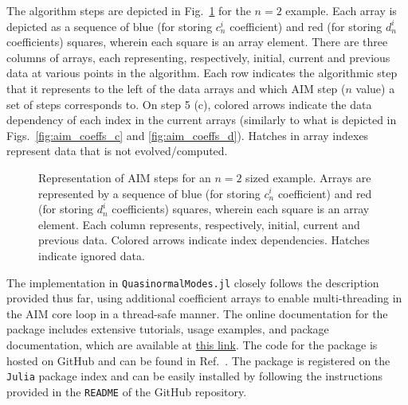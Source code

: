 %
The algorithm steps are depicted in Fig.~\ref{fig:arrays_steps} for the $n=2$ example. Each array is depicted as a sequence of blue (for storing $c^i_n$ coefficient) and red (for storing $d^i_n$ coefficients) squares, wherein each square is an array element. There are three columns of arrays, each representing, respectively, initial, current and previous data at various points in the algorithm. Each row indicates the algorithmic step that it represents to the left of the data arrays and which AIM step ($n$ value) a set of steps corresponds to. On step 5 (c), colored arrows indicate the data dependency of each index in the current arrays (similarly to what is depicted in Figs.~\ref{fig:aim_coeffs_c} and \ref{fig:aim_coeffs_d}). Hatches in array indexes represent data that is not evolved/computed.
%
\begin{figure}[!ht]
  \centering
  \fontsize{9}{10}\selectfont
  
  \caption{Representation of AIM steps for an $n=2$ sized example. Arrays are represented by a sequence of blue (for storing $c^i_n$ coefficient) and red (for storing $d^i_n$ coefficients) squares, wherein each square is an array element. Each column represents, respectively, initial, current and previous data. Colored arrows indicate index dependencies. Hatches indicate ignored data.}
  \label{fig:arrays_steps}
\end{figure}

The implementation in \texttt{QuasinormalModes.jl} closely follows the description provided thus far, using additional coefficient arrays to enable multi-threading in the AIM core loop in a thread-safe manner. The online documentation for the package includes extensive tutorials, usage examples, and package documentation, which are available at \href{https://lucass-carneiro.github.io/QuasinormalModes.jl/stable/}{this link}. The code for the package is hosted on GitHub and can be found in Ref.~\cite{QuasinormalModesRepo}. The package is registered on the \texttt{Julia} package index and can be easily installed by following the instructions provided in the \texttt{README} of the GitHub repository.

